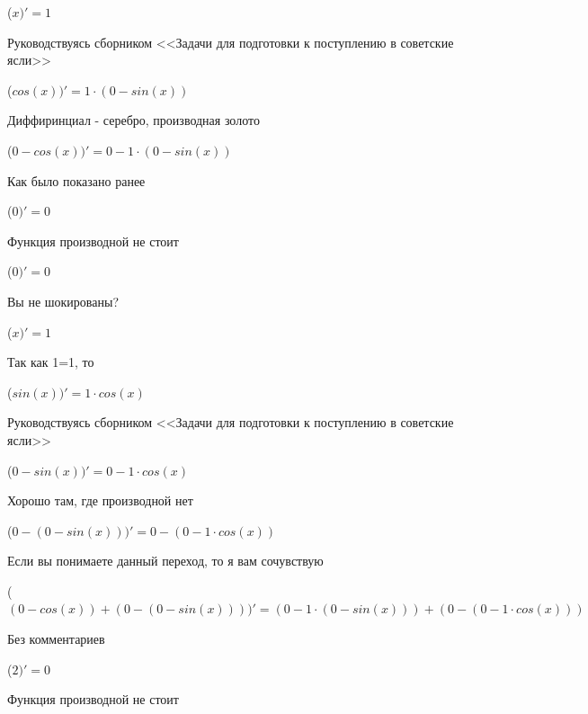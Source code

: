 \documentclass[12pt,a4paper,fleqn]{article}
\begin{document}
\begin{center}
\begin{center}
\begin{center}
\begin{center}
\begin{center}
\begin{center}
\begin{center}
\begin{center}
\begin{center}
\begin{center}
\begin{center}
\begin{center}
\begin{center}
\begin{center}
\begin{center}
\begin{center}
\begin{center}
\begin{center}
\begin{center}
\begin{center}
\begin{center}
\begin{center}
\begin{center}
\begin{center}
\begin{center}
\begin{center}
 ($x)'
  = 1$\end{center}
Руководствуясь сборником <<Задачи для подготовки к поступлению в советские ясли>>\cite{link1}

\begin{center}
 ($cos(x))'
  = 1 \cdot (0-sin(x))$\end{center}
Диффиринциал - серебро, производная золото\cite{link2}

\begin{center}
 ($0-cos(x))'
  = 0-1 \cdot (0-sin(x))$\end{center}
Как было показано ранее

\begin{center}
 ($0)'
  = 0$\end{center}
Функция производной не стоит\cite{link2}

\begin{center}
 ($0)'
  = 0$\end{center}
Вы не шокированы?\cite{link3}

\begin{center}
 ($x)'
  = 1$\end{center}
Так как 1=1, то\cite{link4}

\begin{center}
 ($sin(x))'
  = 1 \cdot cos(x)$\end{center}
Руководствуясь сборником <<Задачи для подготовки к поступлению в советские ясли>>\cite{link1}

\begin{center}
 ($0-sin(x))'
  = 0-1 \cdot cos(x)$\end{center}
Хорошо там, где производной нет\cite{link2}

\begin{center}
 ($0-(0-sin(x)))'
  = 0-(0-1 \cdot cos(x))$\end{center}
Если вы понимаете данный переход, то я вам сочувствую

\begin{center}
 ($(0-cos(x))+(0-(0-sin(x))))'
  = (0-1 \cdot (0-sin(x)))+(0-(0-1 \cdot cos(x)))$\end{center}
Без комментариев\cite{link4}

\begin{center}
 ($2)'
  = 0$\end{center}
Функция производной не стоит\cite{link2}


\end{center}
\end{center}
\end{center}
\end{center}
\end{center}
\end{center}
\end{center}
\end{center}
\end{center}
\end{center}
\end{center}
\end{center}
\end{center}
\end{center}
\end{center}
\end{center}
\end{center}
\end{center}
\end{center}
\end{center}
\end{center}
\end{center}
\end{center}
\end{center}
\end{center}
\end{document}
